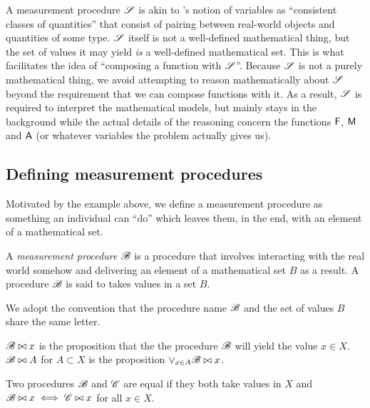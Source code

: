 A measurement procedure $\mathscr{S}$ is akin to \citet{menger_random_2003}'s notion of variables as ``consistent classes of quantities'' that consist of pairing between real-world objects and quantities of some type. $\mathscr{S}$ itself is not a well-defined mathematical thing, but the set of values it may yield \emph{is} a well-defined mathematical set. This is what facilitates the idea of ``composing a function with $\mathscr{S}$''. Because $\mathscr{S}$ is not a purely mathematical thing, we avoid attempting to reason mathematically about $\mathscr{S}$ beyond the requirement that we can compose functions with it. As a result, $\mathscr{S}$ is required to interpret the mathematical models, but mainly stays in the background while the actual details of the reasoning concern the functions $\mathsf{F}$, $\mathsf{M}$ and $\mathsf{A}$ (or whatever variables the problem actually gives us).

\subsection{Defining measurement procedures}\label{sec:mprocs}

Motivated by the example above, we define a measurement procedure as something an individual can ``do'' which leaves them, in the end, with an element of a mathematical set.

\begin{definition}
A \emph{measurement procedure} $\mathscr{B}$ is a procedure that involves interacting with the real world somehow and delivering an element of a mathematical set $B$ as a result. A procedure $\mathscr{B}$ is said to takes values in a set $B$.
\end{definition}

We adopt the convention that the procedure name $\mathscr{B}$ and the set of values $B$ share the same letter.

\begin{definition}
$\mathscr{B}\bowtie x$ is the proposition that the the procedure $\mathscr{B}$ will yield the value $x\in X$. $\mathscr{B}\bowtie A$ for $A\subset X$ is the proposition $\lor_{x\in A} \mathscr{B}\bowtie x$.
\end{definition}

\begin{definition}\label{def:equality}
Two procedures $\mathscr{B}$ and $\mathscr{C}$ are equal if they both take values in $X$ and $\mathscr{B}\bowtie x\iff \mathscr{C}\bowtie x$ for all $x\in X$.
\end{definition}

